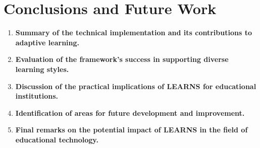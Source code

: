 \section{Conclusions and Future Work}
\begin{enumerate}
    \item \textbf{Summary of the technical implementation and its contributions to adaptive learning.}
    \item \textbf{Evaluation of the framework's success in supporting diverse learning styles.}
    \item \textbf{Discussion of the practical implications of LEARNS for educational institutions.}
    \item \textbf{Identification of areas for future development and improvement.}
    \item \textbf{Final remarks on the potential impact of LEARNS in the field of educational technology.}
\end{enumerate}

